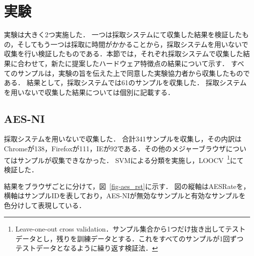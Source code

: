 \newpage
\section{実験}
実験は大きく2つ実施した．
一つは採取システムにて収集した結果を検証したもの，そしてもう一つは採取に時間がかかることから，採取システムを用いないで収集を行い検証したものである．本節では，それぞれ採取システムで収集した結果に合わせて，新たに提案したハードウェア特徴点の結果について示す．
すべてのサンプルは，実験の旨を伝えた上で同意した実験協力者から収集したものである．
結果として，採取システムでは61のサンプルを収集した．
採取システムを用いないで収集した結果については個別に記載する．

\subsection{AES-NI}
採取システムを用いないで収集した．
合計341サンプルを収集し，その内訳はChromeが138，Firefoxが111，IEが92である．その他のメジャーブラウザについてはサンプルが収集できなかった．
SVMによる分類を実施し，LOOCV~\footnote{Leave-one-out cross validation．サンプル集合から1つだけ抜き出してテストデータとし，残りを訓練データとする．これをすべてのサンプルが1回ずつテストデータとなるように繰り返す検証法．}にて検証した．

結果をブラウザごとに分けて，図~\ref{fig-aes_rst}に示す．
図の縦軸はAESRateを，横軸はサンプルIDを表しており，AES-NIが無効なサンプルと有効なサンプルを色分けして表現している．

